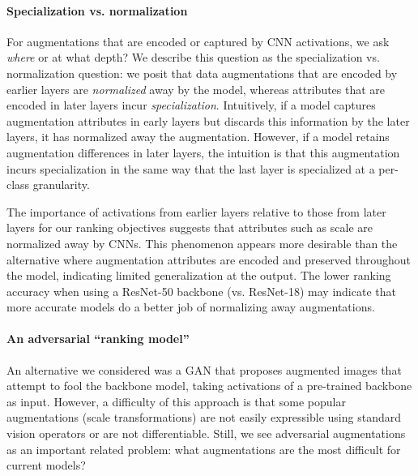 \paragraph{Specialization vs. normalization}
\label{sec:specialization}
For augmentations that are encoded or captured by CNN activations, we ask \emph{where} or at what depth?
We describe this question as the specialization vs. normalization question: we posit that data augmentations that are encoded by earlier layers are \emph{normalized} away by the model, whereas attributes that are encoded in later layers incur \emph{specialization}.
Intuitively, if a model captures augmentation attributes in early layers but discards this information by the later layers, it has normalized away the augmentation.
However, if a model retains augmentation differences in later layers, the intuition is that this augmentation incurs specialization in the same way that the last layer is specialized at a per-class granularity.


The importance of activations from earlier layers relative to those from later layers for our ranking objectives suggests that attributes such as scale are normalized away by CNNs.
This phenomenon appears more desirable than the alternative where augmentation attributes are encoded and preserved throughout the model, indicating limited generalization at the output.
The lower ranking accuracy when using a ResNet-50 backbone (vs. ResNet-18) may indicate that more accurate models do a better job of normalizing away augmentations.

\paragraph{An adversarial ``ranking model''}
An alternative we considered was a GAN that proposes augmented images that attempt to fool the backbone model, taking activations of a pre-trained backbone as input.
However, a difficulty of this approach is that some popular augmentations (scale transformations) are not easily expressible using standard vision operators or are not differentiable.
Still, we see adversarial augmentations as an important related problem: what augmentations are the most difficult for current models?

